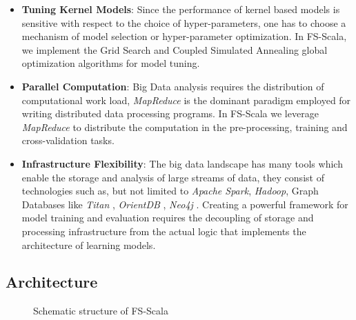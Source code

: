 \begin{itemize}
\item \textbf{Tuning Kernel Models}:
Since the performance of kernel based models is sensitive with respect to the choice of hyper-parameters, one has to choose a mechanism of model selection or hyper-parameter optimization. In FS-Scala, we implement the Grid Search and Coupled Simulated Annealing global optimization algorithms for model tuning.

\item \textbf{Parallel Computation}\label{mr}:
Big Data analysis requires the distribution of computational work load, \textit{MapReduce} is the dominant paradigm employed for writing distributed data processing programs. In FS-Scala we leverage \textit{MapReduce} to distribute the computation in the pre-processing, training and cross-validation tasks.

\item \textbf{Infrastructure Flexibility}:
The big data landscape has many tools which enable the storage and analysis of large streams of data, they consist of technologies such as, but not limited to \textit{Apache Spark}, \textit{Hadoop}, Graph Databases like \textit{Titan} \cite{Titan:2014}, \textit{OrientDB} \cite{OrientDB:2010}, \textit{Neo4j} \cite{Neo4j:2010}. Creating a powerful framework for model training and evaluation requires the decoupling of storage and processing infrastructure from the actual logic that implements the architecture of learning models.
\end{itemize}

\subsection*{Architecture}
\begin{figure}[!ht] 
\begin{adjustbox}{max width=0.95\textwidth}
\end{adjustbox}
\caption{Schematic structure of FS-Scala}
\label{fig:struct}
\end{figure}

